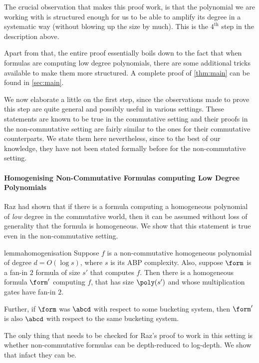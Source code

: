 \noindent The crucial observation that makes this proof work, is that the polynomial we are working with is structured enough for us to be able to amplify its degree in a systematic way (without blowing up the size by much).
This is the $4^{\text{th}}$ step in the description above.

Apart from that, the entire proof essentially boils down to the fact that when formulas are computing low degree polynomials, there are some additional tricks available to make them more structured.
A complete proof of \autoref{thm:main} can be found in \autoref{sec:main}.

We now elaborate a little on the first step, since the observations made to prove this step are quite general and possibly useful in various settings.
These statements are known to be true in the commutative setting and their proofs in the non-commutative setting are fairly similar to the ones for their commutative counterparts.
We state them here nevertheless, since to the best of our knowledge, they have not been stated formally before for the non-commutative setting.

\paragraph*{Homogenising Non-Commutative Formulas computing Low Degree Polynomials}

Raz \cite{R13} had shown that if there is a formula computing a homogeneous polynomial of \emph{low} degree in the commutative world, then it can be assumed without loss of generality that the formula is homogeneous.
We show that this statement is true even in the non-commutative setting. 

\begin{restatable}{lemma}{homogenisation}\label{lem:homogenisation}
	Suppose $f$ is a non-commutative homogeneous polynomial of degree $d = O(\log s)$, where $s$ is its ABP complexity. 
	Also, suppose $\form$ is a fan-in $2$ formula of size $s'$ that computes $f$.
	Then there is a homogeneous formula $\form'$ computing $f$, that has size $\poly(s')$ and whose multiplication gates have fan-in $2$.

	Further, if $\form$ was $\abcd$ with respect to some bucketing system, then $\form'$ is also $\abcd$ with respect to the same bucketing system.
\end{restatable}

The only thing that needs to be checked for Raz's proof to work in this setting is whether non-commutative formulas can be depth-reduced to log-depth.
We show that infact they can be.

